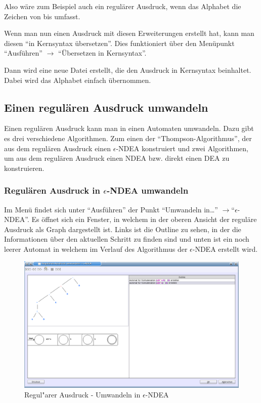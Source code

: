 Also wäre zum Beispiel auch \Symbol{[a-z]} ein regulärer Ausdruck, wenn das Alphabet die Zeichen von  bis  umfasst.

Wenn man nun einen Ausdruck mit diesen Erweiterungen erstellt hat, kann man diesen "`in Kernsyntax übersetzen"'. Dies funktioniert über den Menüpunkt "`Ausführen"' $\rightarrow$ "`Übersetzen in Kernsyntax"'.

Dann wird eine neue Datei erstellt, die den Ausdruck in Kernsyntax beinhaltet. Dabei wird das Alphabet einfach übernommen.

\subsection{Einen regulären Ausdruck umwandeln}

Einen regulären Ausdruck kann man in einen Automaten umwandeln. Dazu gibt es drei verschiedene Algorithmen. Zum einen der "`Thompson-Algorithmus"', der aus dem regulären Ausdruck einen $\epsilon$-NDEA konstruiert und zwei Algorithmen, um aus dem regulären Ausdruck einen NDEA bzw. direkt einen DEA zu konstruieren.

\subsubsection{Regulären Ausdruck in $\epsilon$-NDEA umwandeln}

Im Menü findet sich unter "`Ausführen"' der Punkt "`Umwandeln in\ldots"' $\rightarrow$"`$\epsilon$-NDEA"'. Es öffnet sich ein Fenster, in welchem in der oberen Ansicht der reguläre Ausdruck als Graph dargestellt ist. Links ist die Outline zu sehen, in der die Informationen über den aktuellen Schritt zu finden sind und unten ist ein noch leerer Automat in welchem im Verlauf des Algorithmus der $\epsilon$-NDEA erstellt wird.

\begin{figure}[h]
\begin{center}
\includegraphics[width=12cm]{../images/regex_to_enfa.png}
\caption{Regul"arer Ausdruck - Umwandeln in $\epsilon$-NDEA}
\end{center}
\end{figure}

